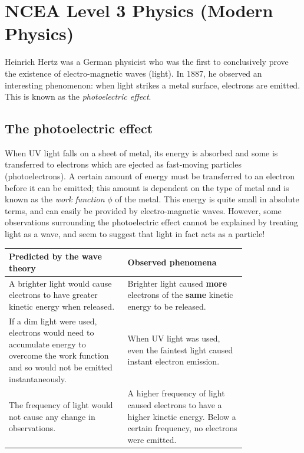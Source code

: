 \documentclass[answers]{exam}
\theoremstyle{definition}
\begin{document}
\section*{NCEA Level 3 Physics (Modern Physics)}
Heinrich Hertz was a German physicist who was the first to conclusively prove
the existence of electro-magnetic waves (light). In 1887, he observed an interesting
phenomenon: when light strikes a metal surface, electrons are emitted. This is known
as the \textit{photoelectric effect}.

\subsection*{The photoelectric effect}
When UV light falls on a sheet of metal, its energy is absorbed and some is transferred
to electrons which are ejected as fast-moving particles (photoelectrons). A certain amount
of energy must be transferred to an electron before it can be emitted; this amount is
dependent on the type of metal and is known as the \textit{work function} $ \phi $ of the metal.
This energy is quite small in absolute terms, and can easily be provided by electro-magnetic waves.
However, some observations surrounding the photoelectric effect cannot be explained by treating
light as a wave, and seem to suggest that light in fact acts as a particle!

\begin{center}
\begin{tabular}{|p{0.4\linewidth}|p{0.4\linewidth}|}
  \hline
  \textbf{Predicted by the wave theory} & \textbf{Observed phenomena}\\\hline
  A brighter light would cause electrons to have greater kinetic energy when released. &
  Brighter light caused \textbf{more} electrons of the \textbf{same} kinetic energy to be released.\\\hline
  If a dim light were used, electrons would need to accumulate energy to overcome the work function and so would not be emitted instantaneously. &
  When UV light was used, even the faintest light caused instant electron emission.\\\hline
  The frequency of light would not cause any change in observations. &
  A higher frequency of light caused electrons to have a higher kinetic energy. Below a certain frequency,
  no electrons were emitted.\\\hline
\end{tabular}
\end{center}
\end{document}
